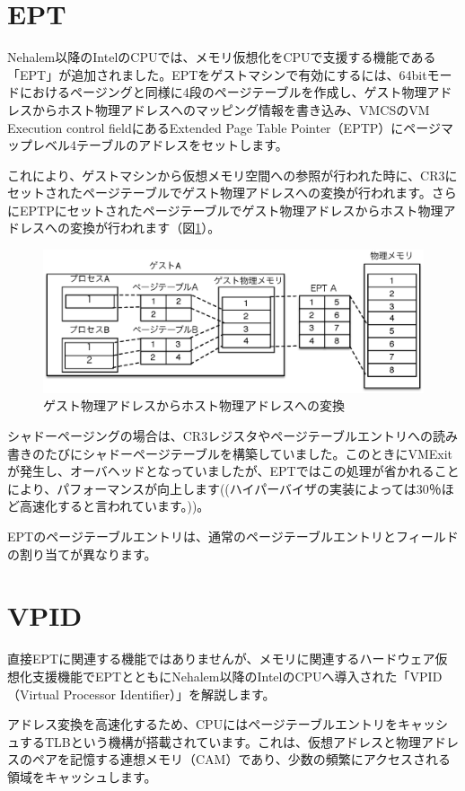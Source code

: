 \documentclass[a4j,12pt]{jarticle}
\begin{document}
\section{EPT}
Nehalem以降のIntelのCPUでは、メモリ仮想化をCPUで支援する機能である「EPT」が追加されました。EPTをゲストマシンで有効にするには、64bitモードにおけるページングと同様に4段のページテーブルを作成し、ゲスト物理アドレスからホスト物理アドレスへのマッピング情報を書き込み、VMCSのVM Execution control fieldにあるExtended Page Table Pointer（EPTP）にページマップレベル4テーブルのアドレスをセットします。

これにより、ゲストマシンから仮想メモリ空間への参照が行われた時に、CR3にセットされたページテーブルでゲスト物理アドレスへの変換が行われます。さらにEPTPにセットされたページテーブルでゲスト物理アドレスからホスト物理アドレスへの変換が行われます（図\ref{fig7}）。

\begin{figure}
\includegraphics[width=1.0\textwidth]{figures/part2_fig7.eps}
\caption{ゲスト物理アドレスからホスト物理アドレスへの変換}
\label{fig7}
\end{figure}

シャドーページングの場合は、CR3レジスタやページテーブルエントリへの読み書きのたびにシャドーページテーブルを構築していました。このときにVMExitが発生し、オーバヘッドとなっていましたが、EPTではこの処理が省かれることにより、パフォーマンスが向上します((ハイパーバイザの実装によっては30％ほど高速化すると言われています。))。

EPTのページテーブルエントリは、通常のページテーブルエントリとフィールドの割り当てが異なります。

\section{VPID}
直接EPTに関連する機能ではありませんが、メモリに関連するハードウェア仮想化支援機能でEPTとともにNehalem以降のIntelのCPUへ導入された「VPID（Virtual Processor Identifier）」を解説します。

アドレス変換を高速化するため、CPUにはページテーブルエントリをキャッシュするTLBという機構が搭載されています。これは、仮想アドレスと物理アドレスのペアを記憶する連想メモリ（CAM）であり、少数の頻繁にアクセスされる領域をキャッシュします。
\end{document}
